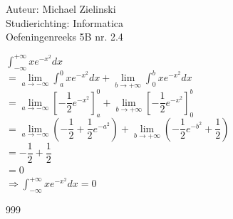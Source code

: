 \documentclass[a4paper]{article}
\newcommand{\dint}{\displaystyle\int}
\newcommand{\llim}{\lim\limits}
\begin{document}
\noindent \large Auteur: Michael Zielinski \\
\noindent \large Studierichting: Informatica \\
\noindent \large Oefeningenreeks 5B nr. 2.4 \\

\normalsize

$\dint_{-\infty}^{+\infty} xe^{-x^2} dx$ \\

$= \llim_{a \to -\infty} \dint_{a}^{0} xe^{-x^2} dx + \llim_{b \to +\infty} \dint_{0}^{b} xe^{-x^2} dx$ \\

$= \llim_{a \to -\infty} \left[ -\dfrac{1}{2} e^{-x^2} \right]_a^0
+ \llim_{b \to +\infty} \left[ -\dfrac{1}{2} e^{-x^2} \right]_0^b$ \\

$= \llim_{a \to -\infty} \left( -\dfrac{1}{2} + \dfrac{1}{2} e^{-a^2} \right)
+ \llim_{b \to +\infty} \left( -\dfrac{1}{2} e^{-b^2} + \dfrac{1}{2} \right)$ \\

$= -\dfrac{1}{2} + \dfrac{1}{2}$ \\

$= 0$ \\

$\Rightarrow \dint_{-\infty}^{+\infty} xe^{-x^2} dx = 0$ \\

\begin{thebibliography}{999}
\end{thebibliography}
\end{document}
